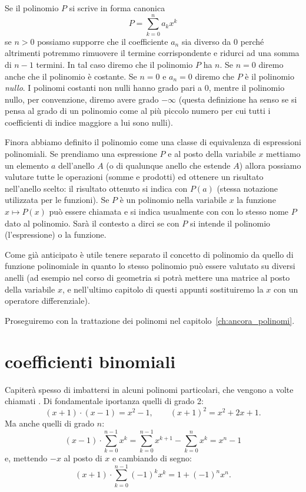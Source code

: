 Se il polinomio $P$ si scrive in forma canonica
\[
  P = \sum_{k=0}^n a_k x^k
\]
se $n>0$ possiamo supporre che il coefficiente $a_n$ sia diverso da $0$ 
perché altrimenti potremmo rimuovere il termine corrispondente e ridurci 
ad una somma di $n-1$ termini. 
In tal caso diremo che il polinomio $P$ ha  $n$.
%
% 
Se $n=0$ diremo anche che il polinomio è costante.
Se $n=0$ e $a_n=0$ diremo che $P$ è il polinomio \emph{nullo}.
I polinomi costanti non nulli hanno grado pari a $0$, mentre il polinomio nullo, 
per convenzione, diremo avere grado $-\infty$ (questa definizione ha senso se si pensa 
al grado di un polinomio come al più piccolo numero per cui tutti i coefficienti di
indice maggiore a lui sono nulli).

Finora abbiamo definito il polinomio come una classe di equivalenza di 
espressioni polinomiali. 
Se prendiamo una espressione $P$ e al posto della variabile $x$ 
mettiamo un elemento $a$ dell'anello $A$ (o di qualunque anello che estende 
$A$) allora possiamo valutare tutte le operazioni (somme e prodotti) ed 
ottenere un risultato nell'anello scelto: il risultato 
ottenuto si indica con $P(a)$ (stessa notazione utilizzata per le funzioni).
Se $P$ è un polinomio nella variabile $x$ la funzione $x\mapsto P(x)$ 
può essere chiamata  e si indica usualmente 
con con lo stesso nome $P$ dato al polinomio. Sarà il contesto a dirci 
se con $P$ si intende il polinomio (l'espressione) o la funzione.

Come già anticipato è utile tenere separato il concetto di polinomio da quello di 
funzione polinomiale in quanto lo stesso polinomio può essere valutato su diversi 
anelli (ad esempio nel corso di geometria si potrà mettere una matrice al posto 
della variabile $x$, e nell'ultimo capitolo di questi appunti 
sostituiremo la $x$ con un operatore differenziale).

Proseguiremo con la trattazione dei polinomi 
nel capitolo~\ref{ch:ancora_polinomi}.

\section{coefficienti binomiali}

Capiterà spesso di imbattersi in alcuni polinomi particolari, che vengono 
a volte chiamati . 
Di fondamentale iportanza quelli di grado 2:
\[
  (x+1)\cdot(x-1) = x^2-1, \qquad (x+1)^2 = x^2+2x + 1.
\]
Ma anche quelli di grado $n$:
\[
  (x-1)\cdot \sum_{k=0}^{n-1} x^k
  = \sum_{k=0}^{n-1} x^{k+1} - \sum_{k=0}^n x^k = x^n - 1
\]
e, mettendo $-x$ al posto di $x$ e cambiando di segno:
\[
  (x+1)\cdot \sum_{k=0}^{n-1} (-1)^k x^k
  = 1 + (-1)^n x^n.
\]

